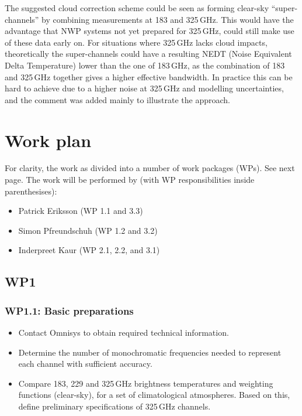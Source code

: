 \documentclass[BCOR=1cm,12pt,bibliography=totoc]{article}
\begin{document}
The suggested cloud correction scheme could be seen as forming clear-sky
``super-channels'' by combining measurements at 183 and 325\,GHz. This would
have the advantage that NWP systems not yet prepared for 325\,GHz, could still
make use of these data early on. For situations where 325\,GHz lacks cloud
impacts, theoretically the super-channels could have a resulting NEDT (Noise
Equivalent Delta Temperature) lower than the one of 183\,GHz, as the
combination of 183 and 325\,GHz together gives a higher effective bandwidth. In
practice this can be hard to achieve due to a higher noise at 325\,GHz and
modelling uncertainties, and the comment was added mainly to illustrate the
approach.


\section{Work plan}
\label{sec:wp}
%
For clarity, the work as divided into a number of work packages (WPs). See
next page. The work will be performed by (with WP responsibilities inside
parenthesises):
\begin{itemize}
\item Patrick Eriksson (WP 1.1 and 3.3)
\item Simon Pfreundschuh (WP 1.2 and 3.2)
\item Inderpreet Kaur (WP 2.1, 2.2, and 3.1)
\end{itemize}

\newpage
\subsection*{WP1}
%
\subsubsection*{WP1.1: Basic preparations}
%
\begin{itemize}
\item Contact Omnisys to obtain required technical information.
\item Determine the number of monochromatic frequencies needed to represent each
  channel with sufficient accuracy. 
\item Compare 183, 229 and 325\,GHz brightness temperatures and weighting
  functions (clear-sky), for a set of climatological atmospheres. Based on
  this, define preliminary specifications of 325\,GHz channels.
\end{itemize}
\end{document}
